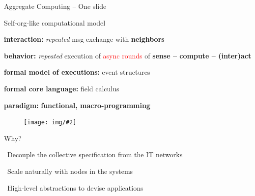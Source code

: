 \documentclass[presentation, 9pt,169]{beamer}\mode<presentation>{\usetheme{AMSBolognaFC}}
\newcommand{\hsplit}[2]{
\begin{minipage}{0.48\textwidth}
#1
\end{minipage}
\hfill
\begin{minipage}{0.48\textwidth}
#2
\end{minipage}
}
\newcommand{\lbl}[1]{\textbf{\textcolor{gray!90!white}{#1}}}
\newcommand{\enf}[1]{{\textcolor{red}{#1}}}
\newcommand{\bo}[1]{\textbf{#1}}
\newcommand{\imgv}[2]{
\begin{figure}
\centering
\texttt{[image: img/\#2]}
\end{figure}
}
\begin{document}
\begin{frame}{Aggregate Computing -- One slide}
  \hsplit{

  \begin{block}{\footnotesize Self-org-like computational model}
  \scriptsize
  
  \lbl{interaction:} \emph{repeated} msg exchange with \bo{neighbors}\vspace{0.1cm}
  
  \lbl{behavior:} \emph{repeated} execution of \enf{async rounds} of \bo{sense -- compute -- (inter)act} \vspace{0.1cm}
  
  
  \lbl{formal model of executions:} event structures \vspace{0.1cm}
  
  \end{block}
  
  \begin{block}{}
  \scriptsize
  
  \lbl{formal core language:} field calculus~\cite{vbdacp:ac:survey:jlamp}\vspace{0.1cm}
  
  \lbl{paradigm:} \bo{functional, macro-programming} \vspace{0.1cm} %
  
  \centering
  \imgv{0.22}{channel.pdf}
  \end{block}
  
  }{
  \begin{block}{\footnotesize Why?}
    \scriptsize
    
    {\bold{\faThumbsUp}} \, Decouple the collective specification from the IT networks  \vspace{0.1cm}
    
    {\bold{\faThumbsUp}} \, Scale naturally with nodes in the systems  \vspace{0.1cm}
     
    {\bold{\faThumbsUp}} \, High-level abstractions to devise applications
    
  \end{block}
  
}
\end{frame}
\end{document}
